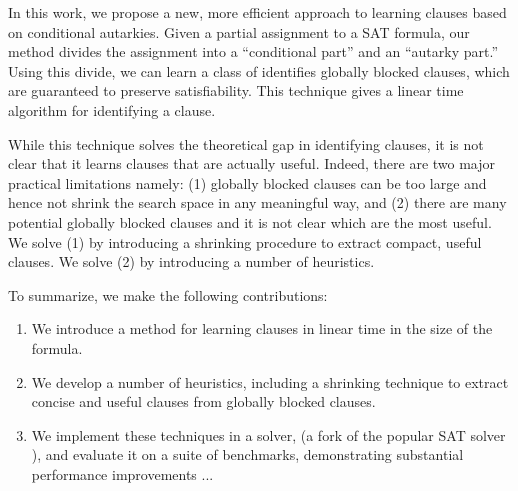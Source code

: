 In this work, we propose a new, more efficient approach to learning \pr clauses based on conditional autarkies. Given a partial assignment to a SAT formula, our method divides the assignment into a ``conditional part'' and an ``autarky part.'' Using this divide, we can learn a class of identifies globally blocked clauses, which are guaranteed to preserve satisfiability. This technique gives a linear time algorithm for identifying a \pr clause.

While this technique solves the theoretical gap in identifying \pr clauses, it is not clear that it learns clauses that are actually useful. Indeed, there are two major practical limitations namely: (1) globally blocked clauses can be too large and hence not shrink the search space in any meaningful way, and (2) there are many potential globally blocked clauses and it is not clear which are the most useful. We solve (1) by introducing a shrinking procedure to extract compact, useful \pr clauses. We solve (2) by introducing a number of heuristics.



To summarize, we make the following contributions: 

\begin{enumerate} 
    \item We introduce a method for learning \pr clauses in linear time in the size of the formula. 
    \item We develop a number of heuristics, including a shrinking technique to extract concise and useful \pr clauses from globally blocked clauses. 
    \item We implement these techniques in a solver, \tool (a fork of the popular SAT solver \cadical), and evaluate it on a suite of benchmarks, demonstrating substantial performance improvements ... 
\end{enumerate}